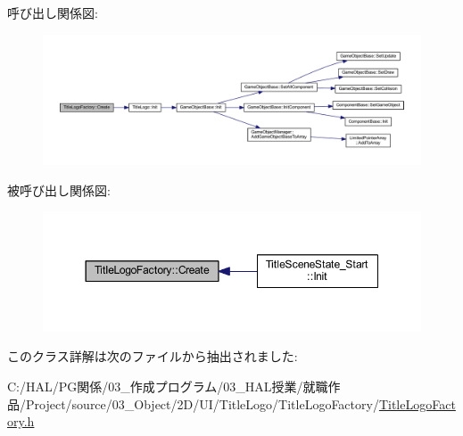呼び出し関係図\+:\nopagebreak
\begin{figure}[H]
\begin{center}
\leavevmode
\includegraphics[width=350pt]{class_title_logo_factory_acbd10f361541910e9c0cee26770f0150_cgraph}
\end{center}
\end{figure}
被呼び出し関係図\+:\nopagebreak
\begin{figure}[H]
\begin{center}
\leavevmode
\includegraphics[width=350pt]{class_title_logo_factory_acbd10f361541910e9c0cee26770f0150_icgraph}
\end{center}
\end{figure}


このクラス詳解は次のファイルから抽出されました\+:\begin{DoxyCompactItemize}
\item 
C\+:/\+H\+A\+L/\+P\+G関係/03\+\_\+作成プログラム/03\+\_\+\+H\+A\+L授業/就職作品/\+Project/source/03\+\_\+\+Object/2\+D/\+U\+I/\+Title\+Logo/\+Title\+Logo\+Factory/\mbox{\hyperlink{_title_logo_factory_8h}{Title\+Logo\+Factory.\+h}}\end{DoxyCompactItemize}
